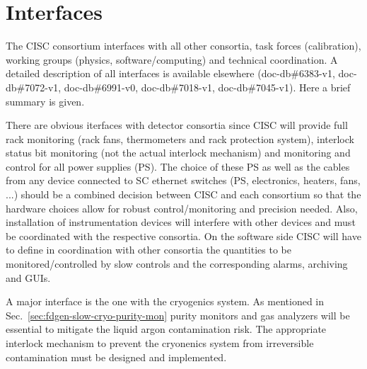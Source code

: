\section{Interfaces}
\label{sec:fdgen-slow-cryo-intfc}


The CISC consortium interfaces with all other consortia, task forces (calibration), working groups (physics, software/computing) and technical coordination.  
A detailed description of all interfaces is available elsewhere (doc-db\#6383-v1, doc-db\#7072-v1, doc-db\#6991-v0, doc-db\#7018-v1, doc-db\#7045-v1).
Here a brief summary is given. 

There are obvious iterfaces with detector consortia since CISC will provide full rack monitoring (rack fans, thermometers and rack protection system),
interlock status bit monitoring (not the actual interlock mechanism) and monitoring and control for all power supplies (PS). The choice of these   
PS as well as the cables from any device connected to SC ethernet switches (PS, electronics, heaters, fans, ...)
should be a combined decision between CISC and each consortium so that the hardware choices allow for robust control/monitoring and precision needed.  
Also, installation of instrumentation devices will interfere with other devices and must be coordinated with the respective consortia.  
On the software side CISC will have to define in coordination with other consortia the quantities to be monitored/controlled by slow controls and the corresponding alarms,
archiving and GUIs. 



A major interface is the one with the cryogenics system. As mentioned in Sec.~\ref{sec:fdgen-slow-cryo-purity-mon} purity monitors and gas analyzers will be essential
to mitigate the liquid argon contamination risk. The appropriate interlock mechanism to prevent the cryonenics system from irreversible contamination
must be designed and implemented. 

